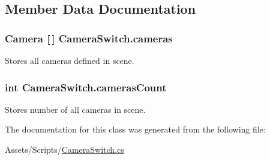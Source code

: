 \subsection{Member Data Documentation}
\hypertarget{class_camera_switch_a4797769d49b74b29a261aa81c820b25d}{}
\subsubsection[{cameras}]{\setlength{\rightskip}{0pt plus 5cm}Camera \mbox{[}$\,$\mbox{]} Camera\+Switch.\+cameras}\label{class_camera_switch_a4797769d49b74b29a261aa81c820b25d}


Stores all cameras defined in scene. 

\hypertarget{class_camera_switch_a61b4cf53f1fc86e226eefdb6685ab777}{}
\subsubsection[{cameras\+Count}]{\setlength{\rightskip}{0pt plus 5cm}int Camera\+Switch.\+cameras\+Count}\label{class_camera_switch_a61b4cf53f1fc86e226eefdb6685ab777}


Stores number of all cameras in scene. 



The documentation for this class was generated from the following file\+:\begin{DoxyCompactItemize}
\item 
Assets/\+Scripts/\hyperlink{_camera_switch_8cs}{Camera\+Switch.\+cs}\end{DoxyCompactItemize}
